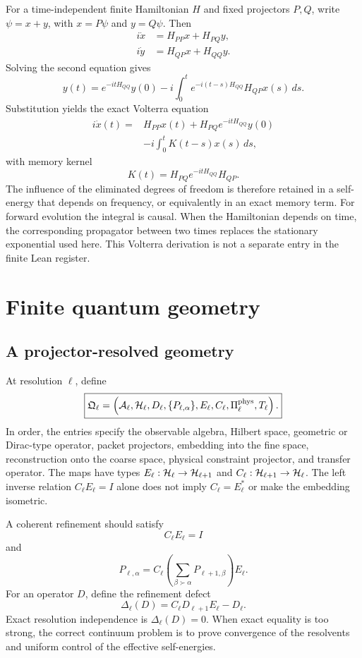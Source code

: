For a time-independent finite Hamiltonian $H$ and fixed projectors $P,Q$, write $\psi=x+y$, with $x=P\psi$ and $y=Q\psi$. Then
\[
\begin{aligned}
i\dot x&=H_{PP}x+H_{PQ}y,\\
i\dot y&=H_{QP}x+H_{QQ}y.
\end{aligned}
\]
Solving the second equation gives
\[
y(t)
=e^{-itH_{QQ}}y(0)
-i\int_0^t e^{-i(t-s)H_{QQ}}H_{QP}x(s)\,ds.
\]
Substitution yields the exact Volterra equation
\[
\boxed{
\begin{aligned}
i\dot x(t)
={}&H_{PP}x(t)
+H_{PQ}e^{-itH_{QQ}}y(0)\\
&-i\int_0^t
K(t-s)x(s)\,ds,
\end{aligned}
}
\]
with memory kernel
\[
\boxed{
K(t)=H_{PQ}e^{-itH_{QQ}}H_{QP}.
}
\]
The influence of the eliminated degrees of freedom is therefore retained in a self-energy that depends on frequency, or equivalently in an exact memory term. For forward evolution the integral is causal. When the Hamiltonian depends on time, the corresponding propagator between two times replaces the stationary exponential used here. This Volterra derivation is not a separate entry in the finite Lean register.

\section{Finite quantum geometry}\label{core:section:010}

\subsection{A projector-resolved geometry}

At resolution $\ell$, define
\[
\boxed{
\mathfrak Q_\ell
=
\left(
\cA_\ell,
\cH_\ell,
D_\ell,
\{P_{\ell,\alpha}\},
E_\ell,
C_\ell,
\Pi_\ell^{\mathrm{phys}},
T_\ell
\right).
}
\]
In order, the entries specify the observable algebra, Hilbert space, geometric or Dirac-type operator, packet projectors, embedding into the fine space, reconstruction onto the coarse space, physical constraint projector, and transfer operator. The maps have types $E_\ell:\cH_\ell\to\cH_{\ell+1}$ and $C_\ell:\cH_{\ell+1}\to\cH_\ell$. The left inverse relation $C_\ell E_\ell=I$ alone does not imply $C_\ell=E_\ell^*$ or make the embedding isometric.

A coherent refinement should satisfy
\[
C_\ell E_\ell=I
\]
and
\[
\boxed{
P_{\ell,\alpha}
=
C_\ell
\left(
\sum_{\beta\succ\alpha}P_{\ell+1,\beta}
\right)
E_\ell.
}
\]
For an operator $D$, define the refinement defect
\[
\Delta_\ell(D)
=C_\ell D_{\ell+1}E_\ell-D_\ell.
\]
Exact resolution independence is $\Delta_\ell(D)=0$. When exact equality is too strong, the correct continuum problem is to prove convergence of the resolvents and uniform control of the effective self-energies.

